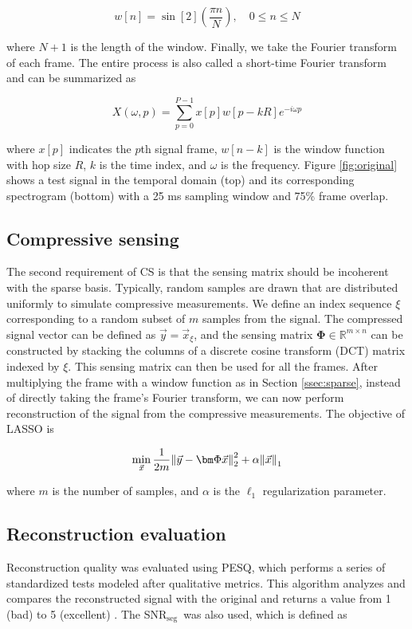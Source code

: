 \documentclass[10pt,a4paper,twoside]{article}
\newcommand{\snrseg}{SNR$_{\mathrm{seg}}$}
\begin{document}
\begin{equation}\label{eq:hann}
	w[n] = \sin[2](\frac{\pi n}{N}), \quad 0 \leq n \leq N
\end{equation}

\noindent where $N+1$ is the length of the window. Finally, we take the Fourier transform of each frame. The entire process is also called a short-time Fourier transform and can be summarized as

\begin{equation}\label{eq:stft}
	X(\omega, p) = \sum_{p=0}^{P-1} x[p] w[p - kR] e^{-i\omega p}
\end{equation}

\noindent where $x[p]$ indicates the $p$th signal frame, $w[n-k]$ is the window function with hop size $R$, $k$ is the time index, and $\omega$ is the frequency. Figure \ref{fig:original} shows a test signal in the temporal domain (top) and its corresponding spectrogram (bottom) with a 25 ms sampling window and 75\% frame overlap.

\subsection{Compressive sensing}\label{ssec:cs}
The second requirement of CS is that the sensing matrix should be incoherent with the sparse basis. Typically, random samples are drawn that are distributed uniformly to simulate compressive measurements. We define an index sequence $\xi$ corresponding to a random subset of $m$ samples from the signal. The compressed signal vector can be defined as $\vec{y} = \vec{x}_\xi$, and the sensing matrix $\bm\Phi \in \mathbb{R}^{m \times n}$ can be constructed by stacking the columns of a discrete cosine transform (DCT) matrix indexed by $\xi$. This sensing matrix can then be used for all the frames. After multiplying the frame with a window function as in Section \ref{ssec:sparse}, instead of directly taking the frame's Fourier transform, we can now perform reconstruction of the signal from the compressive measurements. The objective of LASSO \cite{scikit-learn} is

\begin{equation}\label{eq:lasso}
	\min_{\vec{x}} \frac{1}{2m} \norm{\vec{y} - \bm\Phi \vec{x}}_2^2 + \alpha\norm{\vec{x}}_1
\end{equation}

\noindent where $m$ is the number of samples, and $\alpha$ is the $\ell_1$ regularization parameter.

\subsection{Reconstruction evaluation}\label{ssec:eval}
Reconstruction quality was evaluated using PESQ, which performs a series of standardized tests modeled after qualitative metrics. This algorithm analyzes and compares the reconstructed signal with the original and returns a value from 1 (bad) to 5 (excellent) \cite{pesq}. The \snrseg~was also used, which is defined as \cite{Loizou}
\end{document}
